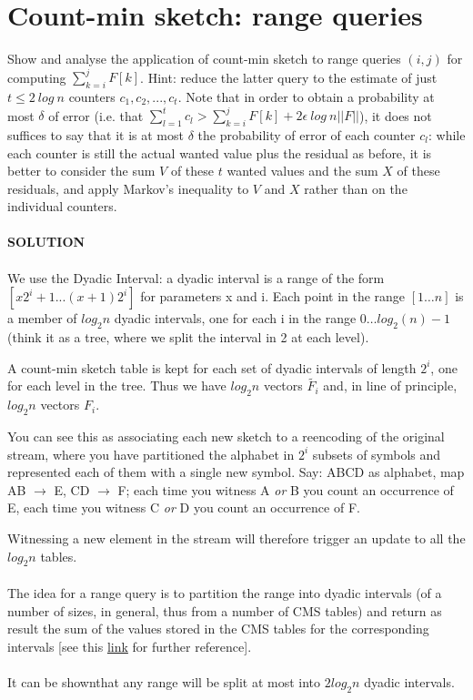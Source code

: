 \documentclass[a4paper]{article}
\begin{document}
\section*{Count-min sketch: range queries}
Show and analyse the application of count-min sketch to range queries $(i,j)$ for computing  $\sum^j_{k=i} F[k]$. Hint: reduce the latter query to the estimate of just $t \leq 2\ log\ n$ counters $c_1,c_2,...,c_t$. Note that in order to obtain a probability at most $\delta$ of error (i.e. that $\sum^t_{l=1}c_l > \sum^j_{k=i}F[k] + 2\epsilon\ log\ n ||F||$), it does not suffices to say that it is at most $\delta$ the probability of error of each counter $c_l$: while each counter is still the actual wanted value plus the residual as before, it is better to consider the sum $V$ of these $t$ wanted values and the sum $X$ of these residuals, and apply Markov's inequality to $V$ and $X$ rather than on the individual counters.
\\
\\
\textbf{SOLUTION}
\\
\\
We use the Dyadic Interval: a dyadic interval is a range of the form $[x2^i+1 . . .(x+1)2^i]$  for parameters x and i. Each point in the range $[1\dots n]$ is a member of $log_2 n$ dyadic intervals, one for each i in the range $0\dots log_2(n) − 1$ (think it as a tree, where we split the interval in 2 at each level).

A count-min sketch table is kept for each set of dyadic intervals of length $2^i$, one for each level in the tree. Thus we have $log_2 n$ vectors $\widetilde{F_i}$ and, in line of principle, $log_2 n$ vectors $F_i$.

You can see this as associating each new sketch to a reencoding of the original stream, where you have partitioned the alphabet in $2^i$ subsets of symbols and represented each of them with a single new symbol.
Say: ABCD as alphabet, map AB $\rightarrow$ E, CD $\rightarrow$ F; each time you witness A \emph{or} B you count an occurrence of E, each time you witness C \emph{or} D you count an occurrence of F.

Witnessing a new element in the stream will therefore trigger an update to all the $log_2 n$ tables.
\\
\\
The idea for a range query is to partition the range into dyadic intervals (of a number of sizes, in general, thus from a number of CMS tables) and return as result the sum of the values stored in the CMS tables for the corresponding intervals [see this \href{http://dimacs.rutgers.edu/~graham/pubs/papers/cm-full.pdf}{link} for further reference].
\\
\\
It can be shown\footnotemark that any range will be split at most into $2log_2 n$ dyadic intervals.
\end{document}
